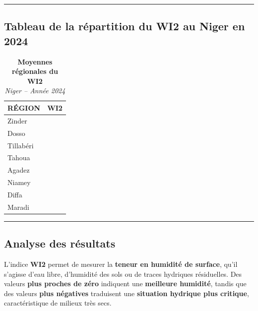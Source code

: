 \documentclass[
]{book}
\begin{document}
\begin{center}\rule{0.5\linewidth}{0.5pt}\end{center}

\subsection{Tableau de la répartition du WI2 au Niger en 2024}\label{tableau-de-la-ruxe9partition-du-wi2-au-niger-en-2024}

\begin{table}[!t]
\caption*{
{\large \textbf{Moyennes régionales du WI2}} \\ 
{\small \emph{Niger -- Année 2024}}
} 
\fontsize{12.0pt}{14.4pt}\selectfont
\begin{tabular*}{\linewidth}{@{\extracolsep{\fill}}lr}
\toprule
{RÉGION} & {WI2} \\ 
\midrule\addlinespace[2.5pt]
Zinder & {\cellcolor[HTML]{4B98C9}{\textcolor[HTML]{FFFFFF}{-0.525}}} \\ 
Dosso & {\cellcolor[HTML]{08306B}{\textcolor[HTML]{FFFFFF}{-0.485}}} \\ 
Tillabéri & {\cellcolor[HTML]{1B67AD}{\textcolor[HTML]{FFFFFF}{-0.506}}} \\ 
Tahoua & {\cellcolor[HTML]{89BEDC}{\textcolor[HTML]{000000}{-0.542}}} \\ 
Agadez & {\cellcolor[HTML]{F7FBFF}{\textcolor[HTML]{000000}{-0.585}}} \\ 
Niamey & {\cellcolor[HTML]{094286}{\textcolor[HTML]{FFFFFF}{-0.492}}} \\ 
Diffa & {\cellcolor[HTML]{2474B6}{\textcolor[HTML]{FFFFFF}{-0.511}}} \\ 
Maradi & {\cellcolor[HTML]{1964AB}{\textcolor[HTML]{FFFFFF}{-0.505}}} \\ 
\bottomrule
\end{tabular*}
\end{table}

\begin{center}\rule{0.5\linewidth}{0.5pt}\end{center}

\subsection{Analyse des résultats}\label{analyse-des-ruxe9sultats-11}

L'indice \textbf{WI2} permet de mesurer la \textbf{teneur en humidité de surface}, qu'il s'agisse d'eau libre, d'humidité des sols ou de traces hydriques résiduelles. Des valeurs \textbf{plus proches de zéro} indiquent une \textbf{meilleure humidité}, tandis que des valeurs \textbf{plus négatives} traduisent une \textbf{situation hydrique plus critique}, caractéristique de milieux très secs.
\end{document}
